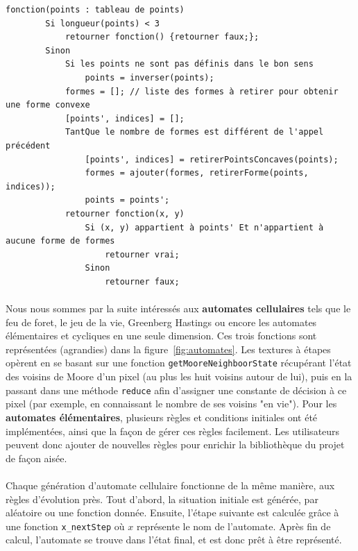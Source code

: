 \documentclass[a4paper]{article}
\begin{document}
\begin{lstlisting}[caption ={Fonction déterminant l'appartenance d'un point à une forme}, label=algo:isInShape, float=h]
    fonction(points : tableau de points)
        Si longueur(points) < 3
            retourner fonction() {retourner faux;};
        Sinon
            Si les points ne sont pas définis dans le bon sens
                points = inverser(points);
            formes = []; // liste des formes à retirer pour obtenir une forme convexe
            [points', indices] = [];
            TantQue le nombre de formes est différent de l'appel précédent
                [points', indices] = retirerPointsConcaves(points);
                formes = ajouter(formes, retirerForme(points, indices));
                points = points';
            retourner fonction(x, y) 
                Si (x, y) appartient à points' Et n'appartient à aucune forme de formes
                    retourner vrai;
                Sinon 
                    retourner faux;
\end{lstlisting}

\paragraph{}
Nous nous sommes par la suite intéressés aux \textbf{automates cellulaires} tels que le feu de foret, le jeu de la vie\cite{goL}, Greenberg Hastings ou encore les automates élémentaires et cycliques en une seule dimension. Ces trois fonctions sont représentées (agrandies) dans la figure~\ref{fig:automates}. Les textures à étapes opèrent en se basant sur une fonction \texttt{getMooreNeighboorState} récupérant l'état des voisins de Moore\cite{moore} d'un pixel (au plus les huit voisins autour de lui), puis en la passant dans une méthode \texttt{reduce} afin d'assigner une constante de décision à ce pixel (par exemple, en connaissant le nombre de ses voisins "en vie"). Pour les \textbf{automates élémentaires}\cite{elemCellu}, plusieurs règles et conditions initiales ont été implémentées, ainsi que la façon de gérer ces règles facilement. Les utilisateurs peuvent donc ajouter de nouvelles règles pour enrichir la bibliothèque du projet de façon aisée.

\paragraph{}
Chaque génération d'automate cellulaire fonctionne de la même manière, aux règles d'évolution près. Tout d'abord, la situation initiale est générée, par aléatoire ou une fonction donnée. Ensuite, l'étape suivante est calculée grâce à une fonction \texttt{x\_nextStep} où $x$ représente le nom de l'automate. Après fin de calcul, l'automate se trouve dans l'état final, et est donc prêt à être représenté.
\end{document}
